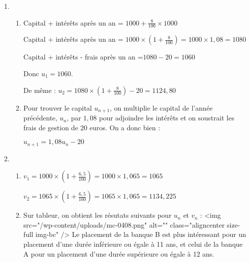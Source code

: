 \begin{corrige}
     \begin{enumerate}
          \item
          \begin{enumerate}[label=\alph*.]
               \item
               Capital + intérêts après un an  = $1000 + \frac{8}{100}\times 1000$
               \par
               Capital + intérêts après un an  = $1000\times \left(1+\frac{8}{100}\right)=1000\times 1,08=1080$
               \par
               Capital + intérêts - frais après un an =$1080-20 = 1060$
               \par
               Donc $u_{1}=1060$.
               \par
               De même : $u_{2}=1080\times \left(1+\frac{8}{100}\right)-20 = 1124,80$
               \item
               Pour trouver le capital $u_{n+1}$, on multiplie le capital de l'année précédente, $u_{n}$, par $1,08$ pour adjoindre les intérêts et on soustrait les frais de gestion de $20$ euros. On a donc bien :
               \par
               $u_{n+1}=1,08u_{n}-20$
          \end{enumerate}
          \item
          \begin{enumerate}[label=\alph*.]
               \item
               $v_{1}=1000\times \left(1+\frac{6,5}{100}\right)=1000\times 1,065=1065$
               \par
               $v_{2}=1065\times \left(1+\frac{6,5}{100}\right)=1065\times 1,065=1134,225$
               \item
               Sur tableur, on obtient les résutats suivants pour $u_{n}$ et $v_{n}$ :
               <img src="/wp-content/uploads/mc-0408.png" alt="" class="aligncenter size-full  img-bc" />
               Le placement de la banque B est plus intéressant pour un placement d'une durée inférieure ou égale à 11 ans, et celui de la banque A pour un placement d'une durée supérieure ou égale à 12 ans.
          \end{enumerate}
     \end{enumerate}
\end{corrige}
